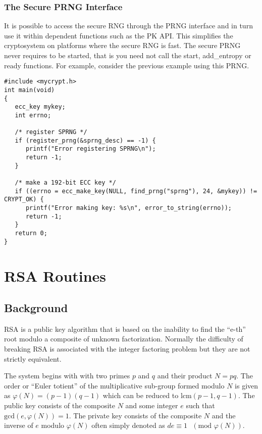 \documentclass{book}
\def\phi{\varphi}
\begin{document}
\subsection{The Secure PRNG Interface}
It is possible to access the secure RNG through the PRNG interface and in turn use it within dependent functions such
as the PK API.  This simplifies the cryptosystem on platforms where the secure RNG is fast.  The secure PRNG never 
requires to be started, that is you need not call the start, add\_entropy or ready functions.  For example, consider
the previous example using this PRNG.

\begin{small}
\begin{verbatim}
#include <mycrypt.h>
int main(void)
{
   ecc_key mykey;
   int errno;

   /* register SPRNG */
   if (register_prng(&sprng_desc) == -1) {
      printf("Error registering SPRNG\n");
      return -1;
   }

   /* make a 192-bit ECC key */
   if ((errno = ecc_make_key(NULL, find_prng("sprng"), 24, &mykey)) != CRYPT_OK) {
      printf("Error making key: %s\n", error_to_string(errno));
      return -1;
   }
   return 0;
}
\end{verbatim}
\end{small}

\chapter{RSA Routines}

\section{Background}

RSA is a public key algorithm that is based on the inability to find the ``e-th'' root modulo a composite of unknown 
factorization.  Normally the difficulty of breaking RSA is associated with the integer factoring problem but they are
not strictly equivalent.

The system begins with with two primes $p$ and $q$ and their product $N = pq$.  The order or ``Euler totient'' of the
multiplicative sub-group formed modulo $N$ is given as $\phi(N) = (p - 1)(q - 1)$ which can be reduced to 
$\mbox{lcm}(p - 1, q - 1)$.  The public key consists of the composite $N$ and some integer $e$ such that 
$\mbox{gcd}(e, \phi(N)) = 1$.  The private key consists of the composite $N$ and the inverse of $e$ modulo $\phi(N)$ 
often simply denoted as $de \equiv 1\mbox{ }(\mbox{mod }\phi(N))$.
\end{document}
